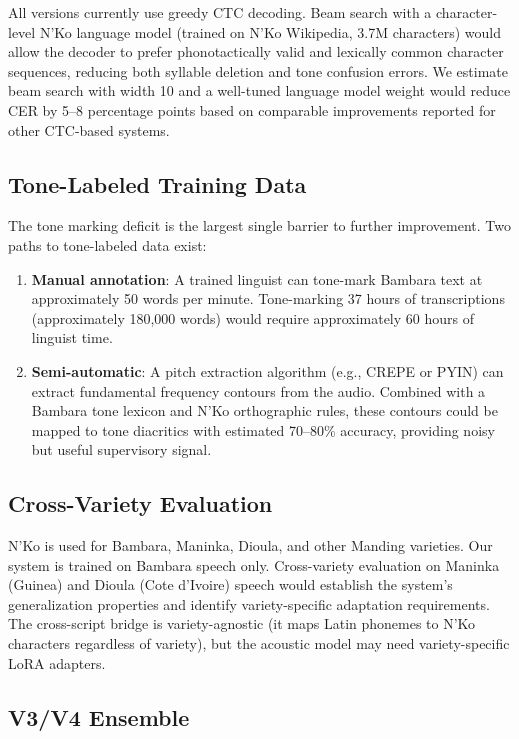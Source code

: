 \documentclass[11pt]{article}
\begin{document}
All versions currently use greedy CTC decoding.
Beam search with a character-level N'Ko language model (trained on N'Ko Wikipedia, 3.7M characters) would allow the decoder to prefer phonotactically valid and lexically common character sequences, reducing both syllable deletion and tone confusion errors.
We estimate beam search with width 10 and a well-tuned language model weight would reduce CER by 5--8 percentage points based on comparable improvements reported for other CTC-based systems.

\subsection{Tone-Labeled Training Data}

The tone marking deficit is the largest single barrier to further improvement.
Two paths to tone-labeled data exist:
\begin{enumerate}
\item \textbf{Manual annotation}: A trained linguist can tone-mark Bambara text at approximately 50 words per minute. Tone-marking 37 hours of transcriptions (approximately 180,000 words) would require approximately 60 hours of linguist time.
\item \textbf{Semi-automatic}: A pitch extraction algorithm (e.g., CREPE or PYIN) can extract fundamental frequency contours from the audio. Combined with a Bambara tone lexicon and N'Ko orthographic rules, these contours could be mapped to tone diacritics with estimated 70--80\% accuracy, providing noisy but useful supervisory signal.
\end{enumerate}

\subsection{Cross-Variety Evaluation}

N'Ko is used for Bambara, Maninka, Dioula, and other Manding varieties.
Our system is trained on Bambara speech only.
Cross-variety evaluation on Maninka (Guinea) and Dioula (Cote d'Ivoire) speech would establish the system's generalization properties and identify variety-specific adaptation requirements.
The cross-script bridge is variety-agnostic (it maps Latin phonemes to N'Ko characters regardless of variety), but the acoustic model may need variety-specific LoRA adapters.

\subsection{V3/V4 Ensemble}
\end{document}
